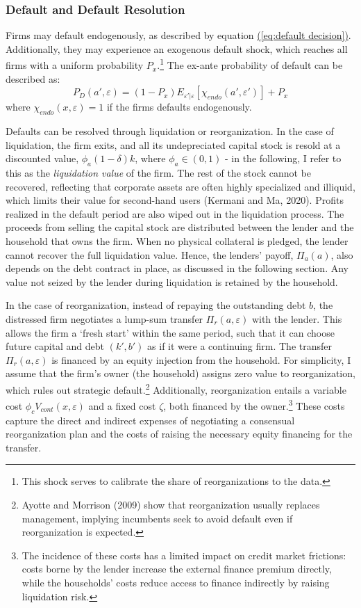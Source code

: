 \documentclass[12pt]{article}
\newcommand{\eref}[1]{\hyperref[#1]{(\ref*{#1})}}
\begin{document}
\subsubsection{Default and Default Resolution} \label{sec:default resolution}
Firms may default endogenously, as described by equation \eref{eq:default decision}. Additionally, they may experience an exogenous default shock, which reaches all firms with a uniform probability $P_{x}$.\footnote{This shock serves to calibrate the share of reorganizations to the data.} The ex-ante probability of default can be described as: 
\begin{equation} \label{eq:default probability}
 P_D(a', \varepsilon) = (1-P_x)E_{\varepsilon'|\varepsilon}[\chi_{endo}(a',\varepsilon')] + P_{x} 
\end{equation}
where $\chi_{endo}(x, \varepsilon) = 1$ if the firms defaults endogenously. 
 
Defaults can be resolved through liquidation or reorganization. In the case of liquidation, the firm exits, and all its undepreciated capital stock is resold at a discounted value, $\phi_a(1-\delta)k$, where $\phi_a \in (0,1)$ - in the following, I refer to this as the \textit{liquidation value} of the firm. The rest of the stock cannot be recovered, reflecting that corporate assets are often highly specialized and illiquid, which limits their value for second-hand users (Kermani and Ma, 2020). Profits realized in the default period are also wiped out in the liquidation process. The proceeds from selling the capital stock are distributed between the lender and the household that owns the firm. When no physical collateral is pledged, the lender cannot recover the full liquidation value. Hence, the lenders' payoff, $\Pi_a(a)$, also depends on the debt contract in place, as discussed in the following section. Any value not seized by the lender during liquidation is retained by the household.

In the case of reorganization, instead of repaying the outstanding debt $b$, the distressed firm negotiates a lump-sum transfer $\Pi_r(a,\varepsilon)$ with the lender. This allows the firm a `fresh start' within the same period, such that it can choose future capital and debt $(k', b')$ as if it were a continuing firm. The transfer $\Pi_r(a,\varepsilon)$ is financed by an equity injection from the household. For simplicity, I assume that the firm's owner (the household) assigns zero value to reorganization, which rules out strategic default.\footnote{Ayotte and Morrison (2009) show that reorganization usually replaces management, implying incumbents seek to avoid default even if reorganization is expected.} Additionally, reorganization entails a variable cost $\phi_c V_{cont}(x,\varepsilon)$ and a fixed cost $\zeta$, both financed by the owner.\footnote{The incidence of these costs has a limited impact on credit market frictions: costs borne by the lender increase the external finance premium directly, while the households' costs reduce access to finance indirectly by raising liquidation risk.} These costs capture the direct and indirect expenses of negotiating a consensual reorganization plan and the costs of raising the necessary equity financing for the transfer.
\end{document}
